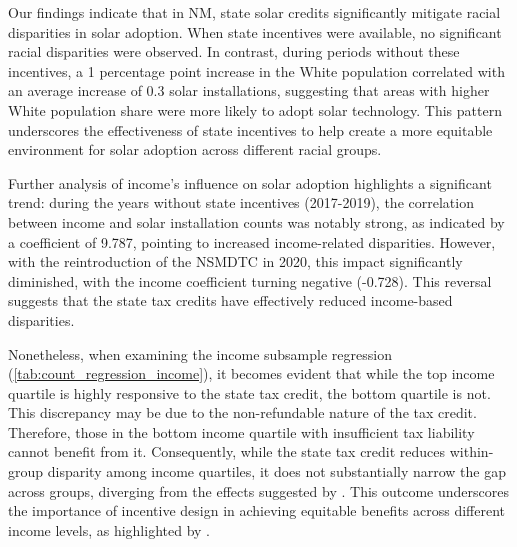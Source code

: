 \documentclass[12pt,twoside,letterpaper]{article}
\begin{document}
Our findings indicate that in NM, state solar credits significantly mitigate racial disparities in solar adoption. When state incentives were available, no significant racial disparities were observed. In contrast, during periods without these incentives, a 1 percentage point increase in the White population correlated with an average increase of 0.3 solar installations, suggesting that areas with higher White population share were more likely to adopt solar technology. This pattern underscores the effectiveness of state incentives to help create a more equitable environment for solar adoption across different racial groups. 

Further analysis of income’s influence on solar adoption highlights a significant trend: during the years without state incentives (2017-2019), the correlation between income and solar installation counts was notably strong, as indicated by a coefficient of 9.787, pointing to increased income-related disparities. However, with the reintroduction of the NSMDTC in 2020, this impact significantly diminished, with the income coefficient turning negative (-0.728). This reversal suggests that the state tax credits have effectively reduced income-based disparities. 

Nonetheless, when examining the income subsample regression (\autoref{tab:count_regression_income}), it becomes evident that while the top income quartile is highly responsive to the state tax credit, the bottom quartile is not. This discrepancy may be due to the non-refundable nature of the tax credit. Therefore, those in the bottom income quartile with insufficient tax liability cannot benefit from it. Consequently, while the state tax credit reduces within-group disparity among income quartiles, it does not substantially narrow the gap across groups, diverging from the effects suggested by \textcite{oshaughnessy_rooftop_2022}. This outcome underscores the importance of incentive design in achieving equitable benefits across different income levels, as highlighted by \textcite{borenstein_distributional_2016}.

\end{document}
